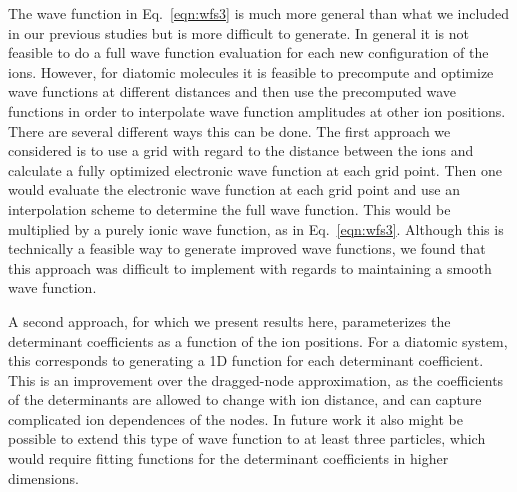 \documentclass[aip,jcp,numerical,reprint]{revtex4-1}
\begin{document}
The wave function in Eq.~\eqref{eqn:wfs3} is much more general than what we included in our previous studies but is more difficult to generate.  In general it is not feasible to do a full wave function evaluation for each new configuration of the ions.  However, for diatomic molecules it is feasible to precompute and optimize wave functions at different distances and then use the precomputed wave functions in order to interpolate wave function amplitudes at other ion positions.  There are several different ways this can be done.   The first approach we considered is to use a grid with regard to the distance between the ions and calculate a fully optimized electronic wave function at each grid point.  Then one would  evaluate the electronic wave function at each grid point and use an interpolation scheme to determine the full wave function.  This would be multiplied by a purely ionic wave function, as in Eq.~\eqref{eqn:wfs3}. Although this is technically a feasible way to generate improved wave functions,  we found that this approach was difficult to implement with regards to maintaining a smooth wave function.   

A second approach, for which we present results here, parameterizes the determinant coefficients as a function of the ion positions.  For a diatomic system, this corresponds to generating a 1D function for each determinant coefficient.  This is an improvement over the dragged-node approximation, as the coefficients of the determinants are allowed to change with ion distance, and can capture complicated ion dependences of the nodes.  In future work it also might be possible to extend this type of wave function to at least three particles, which would require fitting functions for the determinant coefficients in higher dimensions.  





\end{document}
